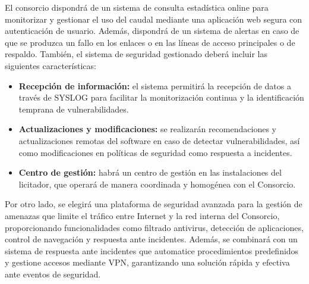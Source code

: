 \vspace{0.5cm}
El consorcio dispondrá de un sistema de consulta estadística online para monitorizar y gestionar el uso del caudal mediante una aplicación web segura con autenticación de usuario. Además, dispondrá de un sistema de alertas en caso de que se produzca un fallo en los enlaces o en las líneas de acceso principales o de respaldo. También, el sistema de seguridad gestionado deberá incluir las siguientes características:
\begin{itemize}
	\item \textbf{Recepción de información:} el sistema permitirá la recepción de datos a través de SYSLOG para facilitar la monitorización continua y la identificación temprana de vulnerabilidades.
	\item \textbf{Actualizaciones y modificaciones:} se realizarán recomendaciones y actualizaciones remotas del software en caso de detectar vulnerabilidades, así como modificaciones en políticas de seguridad como respuesta a incidentes.
	\item \textbf{Centro de gestión:} habrá un centro de gestión en las instalaciones del licitador, que operará de manera coordinada y homogénea con el Consorcio.
\end{itemize}

Por otro lado, se elegirá una plataforma de seguridad avanzada para la gestión de amenazas que limite el tráfico entre Internet y la red interna del Consorcio, proporcionando funcionalidades como filtrado antivirus, detección de aplicaciones, control de navegación y respuesta ante incidentes. Además, se combinará con un sistema de respuesta ante incidentes que automatice procedimientos predefinidos y gestione accesos mediante VPN, garantizando una solución rápida y efectiva ante eventos de seguridad.

